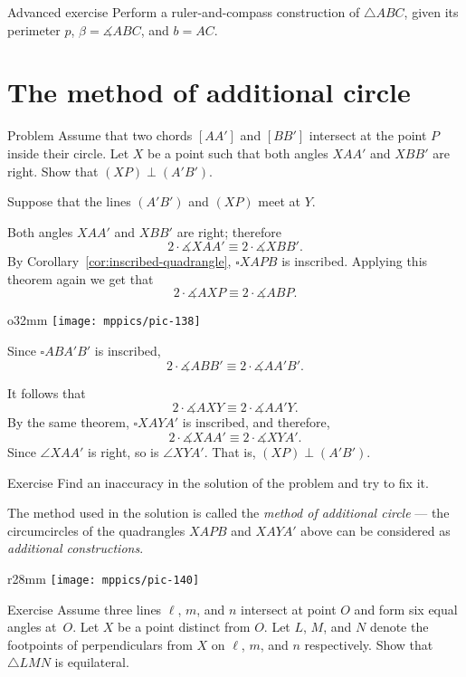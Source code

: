 \begin{thm}{Advanced exercise}\label{ex:perim+angle+side}
Perform a ruler-and-compass construction of $\triangle ABC$, given its perimeter $p$, $\beta=\measuredangle ABC$, and $b=AC$.
\end{thm}

\section{The method of additional circle}

\begin{thm*}{Problem}
 Assume that two chords $[AA']$ and $[BB']$ intersect at the point $P$ inside their circle.
Let $X$ be a point such that both angles $XAA'$ and $XBB'$ are right.
Show that $(XP)\perp(A'B')$.
\end{thm*}

Suppose that the lines $(A'B')$ and $(XP)$ meet at $Y$.

Both angles $XAA'$ and $XBB'$ are right;
therefore
\[2\cdot\measuredangle XAA'
\equiv
2\cdot\measuredangle XBB'.\]
By Corollary~\ref{cor:inscribed-quadrangle},  $\square XAPB$ is inscribed.
Applying this theorem again we get that
\[2\cdot\measuredangle AXP
\equiv
2\cdot\measuredangle ABP.\]

\begin{wrapfigure}[9]{o}{32mm}
\vskip-7mm
\centering
\texttt{[image: mppics/pic-138]}
\end{wrapfigure}

Since $\square ABA'B'$ is inscribed, 
\[2\cdot\measuredangle ABB'
\equiv
2\cdot\measuredangle AA'B'.\]

It follows that 
\[2\cdot\measuredangle AXY
\equiv
2\cdot\measuredangle AA'Y.\]
By the same theorem, $\square XAYA'$ is inscribed,
and
therefore, 
\[2\cdot\measuredangle XAA'
\equiv
2\cdot\measuredangle XYA'.\]
Since $\angle XAA'$ is right, 
so is $\angle XYA'$. 
That is, $(XP)\perp(A'B')$.
\qeds

\begin{thm}{Exercise}\label{ex:inaccuracy}
Find an inaccuracy in the solution of the problem and try to fix it.
\end{thm}

The method used in the solution 
is called the \textit{method of additional circle}
--- the circumcircles of the quadrangles $XAPB$ and $XAYA'$ 
 above can be considered as \textit{additional constructions}. 

{

\begin{wrapfigure}{r}{28mm}
\vskip-8mm
\centering
\texttt{[image: mppics/pic-140]}
\end{wrapfigure}

\begin{thm}{Exercise}\label{ex:equilateral-2}
Assume three lines $\ell$, $m$, and $n$ intersect at point $O$ and form six equal angles at~$O$. 
Let $X$ be a point distinct from $O$.
Let $L$, $M$, and $N$ denote the footpoints of perpendiculars from $X$ on $\ell$, $m$, and $n$ respectively.
Show that $\triangle LMN$ is equilateral.
\end{thm}

}

